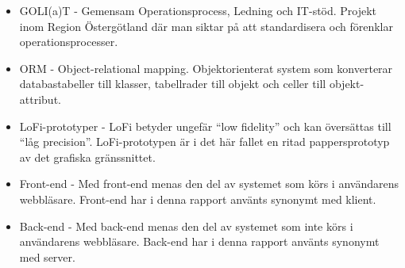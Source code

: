 \begin{itemize}

\item GOLI(a)T - Gemensam Operationsprocess, Ledning och IT-stöd. Projekt inom Region Östergötland där man siktar på att standardisera och förenklar operationsprocesser.

\item ORM - Object-relational mapping. Objektorienterat system som konverterar databastabeller till klasser, tabellrader till objekt och celler till objekt-attribut.

\item LoFi-prototyper - LoFi betyder ungefär ``low fidelity'' och kan översättas till ``låg precision''. LoFi-prototypen är i det här fallet en ritad pappersprototyp av det grafiska gränssnittet.

\item Front-end - Med front-end menas den del av systemet som körs i användarens webbläsare. Front-end har i denna rapport använts synonymt med klient.

\item Back-end - Med back-end menas den del av systemet som inte körs i användarens webbläsare. Back-end har i denna rapport använts synonymt med server. 

\end{itemize}

\newpage
